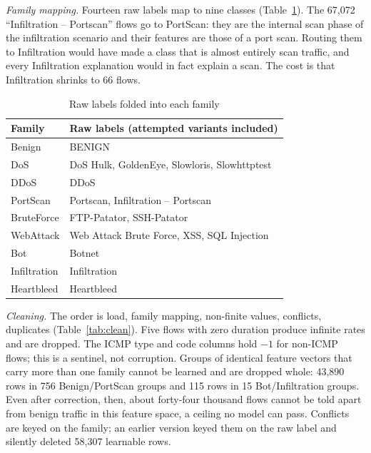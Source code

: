 \emph{Family mapping.} Fourteen raw labels map to nine classes (Table~\ref{tab:familymap}). %
The 67,072 ``Infiltration -- Portscan'' flows go to PortScan: they are the internal scan %
phase of the infiltration scenario and their features are those of a port scan. Routing
them to Infiltration would have made a class that is almost entirely scan traffic, and
every Infiltration explanation would in fact explain a scan. The cost is that
Infiltration shrinks to 66 flows. %

\begin{table}[h]
\centering
\caption{Raw labels folded into each family}
\label{tab:familymap}
\footnotesize
\begin{tabularx}{\columnwidth}{@{}lX@{}}
\toprule
Family & Raw labels (attempted variants included)\\
\midrule
Benign & BENIGN\\
DoS & DoS Hulk, GoldenEye, Slowloris, Slowhttptest\\
DDoS & DDoS\\
PortScan & Portscan, Infiltration -- Portscan\\
BruteForce & FTP-Patator, SSH-Patator\\
WebAttack & Web Attack Brute Force, XSS, SQL Injection\\
Bot & Botnet\\
Infiltration & Infiltration\\
Heartbleed & Heartbleed\\
\bottomrule
\end{tabularx}
\end{table}

\emph{Cleaning.} The order is load, family mapping, non-finite values, conflicts,
duplicates (Table~\ref{tab:clean}). Five flows with zero duration produce infinite rates %
and are dropped. The ICMP type and code columns hold $-1$ for non-ICMP flows; this is a %
sentinel, not corruption. Groups of identical feature vectors that carry more than one
family cannot be learned and are dropped whole: 43,890 rows in 756 Benign/PortScan %
groups and 115 rows in 15 Bot/Infiltration groups. Even after correction, then, about %
forty-four thousand flows cannot be told apart from benign traffic in this feature
space, a ceiling no model can pass. Conflicts are keyed on the family; an earlier
version keyed them on the raw label and silently deleted 58,307 learnable rows. %

